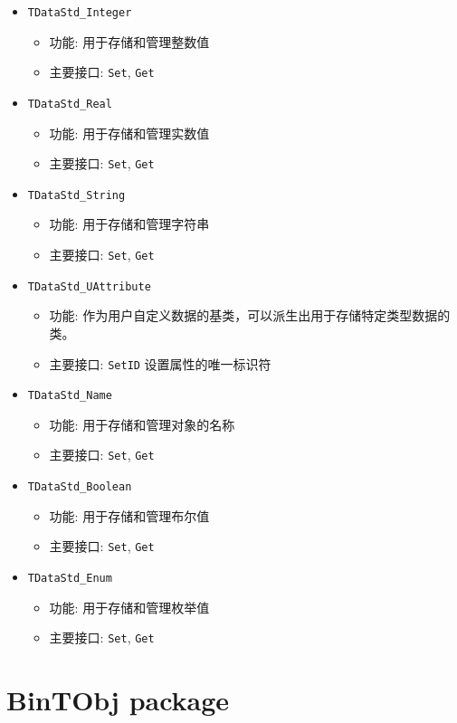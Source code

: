 \documentclass[11pt]{article}
\begin{document}
\begin{itemize}
\item \texttt{TDataStd\_Integer}
\begin{itemize}
\item 功能: 用于存储和管理整数值
\item 主要接口: \texttt{Set}, \texttt{Get}
\end{itemize}
\item \texttt{TDataStd\_Real}
\begin{itemize}
\item 功能: 用于存储和管理实数值
\item 主要接口: \texttt{Set}, \texttt{Get}
\end{itemize}
\item \texttt{TDataStd\_String}
\begin{itemize}
\item 功能: 用于存储和管理字符串
\item 主要接口: \texttt{Set}, \texttt{Get}
\end{itemize}
\item \texttt{TDataStd\_UAttribute}
\begin{itemize}
\item 功能: 作为用户自定义数据的基类，可以派生出用于存储特定类型数据的类。
\item 主要接口: \texttt{SetID} 设置属性的唯一标识符
\end{itemize}
\item \texttt{TDataStd\_Name}
\begin{itemize}
\item 功能: 用于存储和管理对象的名称
\item 主要接口: \texttt{Set}, \texttt{Get}
\end{itemize}
\item \texttt{TDataStd\_Boolean}
\begin{itemize}
\item 功能: 用于存储和管理布尔值
\item 主要接口: \texttt{Set}, \texttt{Get}
\end{itemize}
\item \texttt{TDataStd\_Enum}
\begin{itemize}
\item 功能: 用于存储和管理枚举值
\item 主要接口: \texttt{Set}, \texttt{Get}
\end{itemize}
\end{itemize}
\section{BinTObj package}
\label{sec:orgc0aa9ec}
\end{document}
